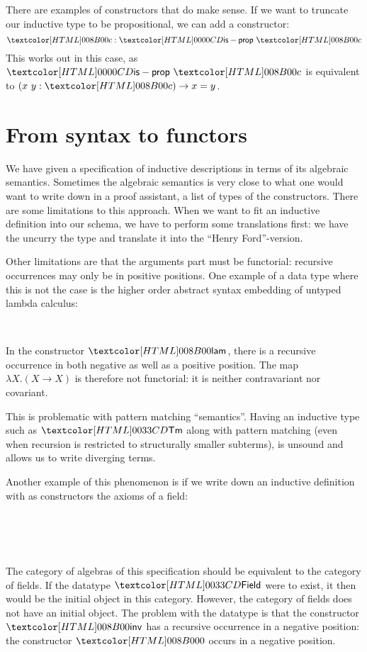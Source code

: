 There are examples of constructors that do make sense. If we want to
truncate our inductive type to be propositional, we can add a
constructor:
$$
\Ac : \isprop\ \Ac
$$
This works out in this case, as $\isprop\ \Ac$ is equivalent to
$(x\ y : \Ac) \to x = y$. 

\section{From syntax to functors}
\label{from-syntax-to-functors}

We have given a specification of inductive descriptions in terms of
its algebraic semantics. Sometimes the algebraic semantics is very
close to what one would want to write down in a proof assistant, \ie a
list of types of the constructors. There are some limitations to this
approach. When we want to fit an inductive definition into our schema,
we have to perform some translations first: we have the uncurry the
type and translate it into the ``Henry Ford''-version.

Other limitations are that the arguments part must be functorial:
recursive occurrences may only be in positive positions. One example
of a data type where this is not the case is the higher order abstract
syntax embedding of untyped lambda calculus:
%
\begin{datatype}{\tttmty}{\Set}
  \constr{\ttapp}{\tttmty \to \tttmty \to \tttmty} \\
  \constr{\ttlam}{(\tttmty \to \tttmty) \to \tttmty}
\end{datatype}
%
In the constructor $\ttlam$, there is a recursive occurrence in both
negative as well as a positive position. The map
$\lambda X . (X \to X)$ is therefore not functorial: it is neither
contravariant nor covariant. 

This is problematic with pattern matching ``semantics''. Having an
inductive type such as $\tttmty$ along with pattern matching (even
when recursion is restricted to structurally smaller subterms), is
unsound and allows us to write diverging terms.

Another example of this phenomenon is if we write down an inductive
definition with as constructors the axioms of a field:
%
\begin{datatype}{\fieldty}{\Set}
  \constr{\fieldzero}{\fieldty} \\
  \constrdots \\
   \\
  \constrdots
\end{datatype}
%
The category of algebras of this specification should be equivalent to
the category of fields. If the datatype $\fieldty$ were to exist, it
then would be the initial object in this category. However, the
category of fields does not have an initial object. The problem with
the datatype is that the constructor $\fieldinv$ has a recursive
occurrence in a negative position: the constructor $\fieldzero$ occurs
in a negative position.

